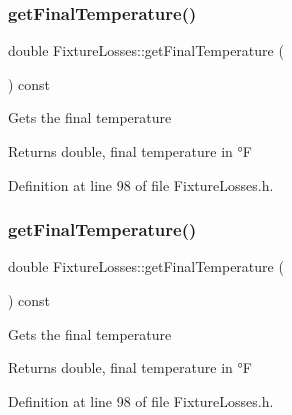 \mbox{\label{class_fixture_losses_a5c4259a78f78c675b063290f0fe6ea36}} 
\subsubsection{\texorpdfstring{get\+Final\+Temperature()}{getFinalTemperature()}\hspace{0.1cm}{\footnotesize\ttfamily [1/3]}}
{\footnotesize\ttfamily double Fixture\+Losses\+::get\+Final\+Temperature (\begin{DoxyParamCaption}{ }\end{DoxyParamCaption}) const\hspace{0.3cm}{\ttfamily [inline]}}

Gets the final temperature \begin{DoxyReturn}{Returns}
double, final temperature in °F 
\end{DoxyReturn}


Definition at line 98 of file Fixture\+Losses.\+h.

\mbox{\label{class_fixture_losses_a5c4259a78f78c675b063290f0fe6ea36}} 
\subsubsection{\texorpdfstring{get\+Final\+Temperature()}{getFinalTemperature()}\hspace{0.1cm}{\footnotesize\ttfamily [2/3]}}
{\footnotesize\ttfamily double Fixture\+Losses\+::get\+Final\+Temperature (\begin{DoxyParamCaption}{ }\end{DoxyParamCaption}) const\hspace{0.3cm}{\ttfamily [inline]}}

Gets the final temperature \begin{DoxyReturn}{Returns}
double, final temperature in °F 
\end{DoxyReturn}


Definition at line 98 of file Fixture\+Losses.\+h.

\mbox{\label{class_fixture_losses_a5c4259a78f78c675b063290f0fe6ea36}} 

